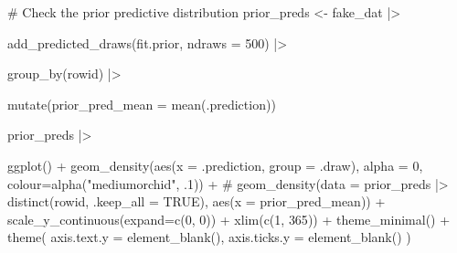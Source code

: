 \documentclass[
  letterpaper,
  DIV=11,
  numbers=noendperiod]{scrreprt}
\newenvironment{Shaded}{\begin{snugshade}}{\end{snugshade}}
\newcommand{\AttributeTok}[1]{\textcolor[rgb]{0.40,0.45,0.13}{#1}}
\newcommand{\CommentTok}[1]{\textcolor[rgb]{0.37,0.37,0.37}{#1}}
\newcommand{\DecValTok}[1]{\textcolor[rgb]{0.68,0.00,0.00}{#1}}
\newcommand{\FunctionTok}[1]{\textcolor[rgb]{0.28,0.35,0.67}{#1}}
\newcommand{\NormalTok}[1]{\textcolor[rgb]{0.00,0.23,0.31}{#1}}
\newcommand{\OtherTok}[1]{\textcolor[rgb]{0.00,0.23,0.31}{#1}}
\newcommand{\SpecialCharTok}[1]{\textcolor[rgb]{0.37,0.37,0.37}{#1}}
\newcommand{\StringTok}[1]{\textcolor[rgb]{0.13,0.47,0.30}{#1}}
\begin{document}
\begin{Shaded}
\begin{Highlighting}[]
\CommentTok{\# Check the prior predictive distribution}
\NormalTok{prior\_preds }\OtherTok{\textless{}{-}}\NormalTok{ fake\_dat }\SpecialCharTok{|\textgreater{}}

  \FunctionTok{add\_predicted\_draws}\NormalTok{(fit.prior, }\AttributeTok{ndraws =} \DecValTok{500}\NormalTok{) }\SpecialCharTok{|\textgreater{}}

  \FunctionTok{group\_by}\NormalTok{(rowid) }\SpecialCharTok{|\textgreater{}}

  \FunctionTok{mutate}\NormalTok{(}\AttributeTok{prior\_pred\_mean =} \FunctionTok{mean}\NormalTok{(.prediction)) }

\NormalTok{prior\_preds }\SpecialCharTok{|\textgreater{}}

  \FunctionTok{ggplot}\NormalTok{() }\SpecialCharTok{+} 
  \FunctionTok{geom\_density}\NormalTok{(}\FunctionTok{aes}\NormalTok{(}\AttributeTok{x =}\NormalTok{ .prediction, }\AttributeTok{group =}\NormalTok{ .draw), }\AttributeTok{alpha =} \DecValTok{0}\NormalTok{, }\AttributeTok{colour=}\FunctionTok{alpha}\NormalTok{(}\StringTok{"mediumorchid"}\NormalTok{, .}\DecValTok{1}\NormalTok{)) }\SpecialCharTok{+}
\CommentTok{\#  geom\_density(data = prior\_preds |\textgreater{} distinct(rowid, .keep\_all = TRUE), aes(x = prior\_pred\_mean)) +}
  \FunctionTok{scale\_y\_continuous}\NormalTok{(}\AttributeTok{expand=}\FunctionTok{c}\NormalTok{(}\DecValTok{0}\NormalTok{, }\DecValTok{0}\NormalTok{)) }\SpecialCharTok{+}
  \FunctionTok{xlim}\NormalTok{(}\FunctionTok{c}\NormalTok{(}\DecValTok{1}\NormalTok{, }\DecValTok{365}\NormalTok{)) }\SpecialCharTok{+}
  \FunctionTok{theme\_minimal}\NormalTok{() }\SpecialCharTok{+}
  \FunctionTok{theme}\NormalTok{(}
    \AttributeTok{axis.text.y =} \FunctionTok{element\_blank}\NormalTok{(),}
    \AttributeTok{axis.ticks.y =} \FunctionTok{element\_blank}\NormalTok{()}
\NormalTok{  ) }
\end{Highlighting}
\end{Shaded}
\end{document}
